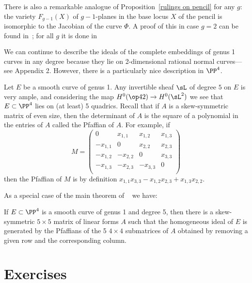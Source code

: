 \begin{fact}
 There is also a remarkable analogue of Proposition~\ref{rulings on pencil} for any $g$: the variety $F_{g-1}(X)$ of $g-1$-planes in the base locus $X$ of the pencil is isomorphic to the Jacobian of the  curve $\Phi$. A proof of this in case $g=2$ can be found in~\cite{Griffiths-Harris1978}; for all $g$ it is done in~\cite{Donagi}
\end{fact}

We can continue to describe the ideals of the complete embeddings of genus 1 curves in any degree because they lie on 2-dimensional rational
normal curves---see Appendix 2. However, there is a particularly nice description in $\PP^4$. 

\begin{fact}
Let $E$ be a smooth curve of genus 1. Any invertible sheaf $\sL$ of degree $5$ on $E$ is very ample, and considering the map $H^0(\op42) \to H^0(\sL^2)$
we see that $E\subset \PP^4$ lies on (at least) 5 quadrics. 
Recall that if $A$ is a skew-symmetric matrix of even size,
then the determinant of $A$ is the square of a polynomial in the entries of $A$ called the Pfaffian of $A$. For example, if
$$
M = \begin{pmatrix}
0&x_{1,1}&x_{1,2}&x_{1,3}\\
-x_{1,1}&0&x_{2,2}&x_{2,3}\\
-x_{1,2}&-x_{2,2}&0&x_{3,3}\\
-x_{1,3}&-x_{2,3}&-x_{3,3}&0\\
\end{pmatrix}
$$
then the Pfaffian of $M$ is by definition $x_{1,1}x_{3,3}-x_{1,2}x_{2,3}+x_{1,3}x_{2,2}$.

As a special case of the main theorem of ~\cite{MR453723} we have:
\begin{proposition} \cite[Theorem11]{Eisenbud1995}
If $E\subset \PP^4$ is a smooth curve of genus 1 and degree 5, then there is a skew-symmetric $5\times 5$ matrix of linear forms $A$
such that the homogeneous ideal of $E$ is generated by the  Pfaffians of the 5 $4\times 4$ submatrices of $A$ obtained by removing
a given row and the corresponding column.
\end{proposition}
\end{fact}

\section{Exercises}


